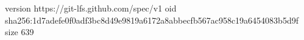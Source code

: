 version https://git-lfs.github.com/spec/v1
oid sha256:1d7adefe0f0adf3bc8d49e9819a6172a8abbecfb567ac958c19a6454083b5d9f
size 639
